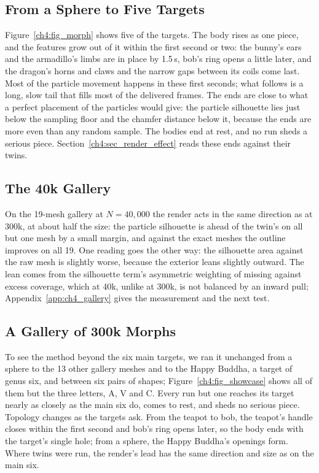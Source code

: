 \subsection{From a Sphere to Five Targets}
Figure~\ref{ch4:fig_morph} shows five of the targets. The body rises as one piece, and the features grow out of it within
the first second or two: the bunny's ears and the armadillo's limbs are in place by 1.5\,s, bob's ring opens a little
later, and the dragon's horns and claws and the narrow gaps between its coils come last. Most of the particle movement
happens in these first seconds; what follows is a long, slow tail that fills most of the delivered frames. The ends are
close to what a perfect placement of the particles would give: the particle silhouette lies just below the sampling floor
and the chamfer distance below it, because the ends are more even than any random sample. The bodies end at rest, and no
run sheds a serious piece. Section~\ref{ch4:sec_render_effect} reads these ends against their twins.

\subsection{The 40k Gallery}
\label{ch4:sec_gallery40}
On the 19-mesh gallery at $N=40{,}000$ the render acts in the same direction as at 300k, at about half the size: the
particle silhouette is ahead of the twin's on all but one mesh by a small margin, and against the exact meshes the outline
improves on all 19. One reading goes the other way: the silhouette area against the raw mesh is slightly worse, because the
exterior leans slightly outward. The lean comes from the silhouette term's asymmetric weighting of missing against excess
coverage, which at 40k, unlike at 300k, is not balanced by an inward pull; Appendix~\ref{app:ch4_gallery} gives the
measurement and the next test.

\subsection{A Gallery of 300k Morphs}
\label{ch4:sec_showcase}
To see the method beyond the six main targets, we ran it unchanged from a sphere to the 13 other gallery meshes and to the
Happy Buddha, a target of genus six, and between six pairs of shapes; Figure~\ref{ch4:fig_showcase} shows all of them but
the three letters, A, V and C. Every run but one
reaches its target nearly as closely as the main six do, comes to rest, and sheds no serious piece. Topology changes as
the targets ask. From the teapot to bob, the teapot's handle closes within the first second and bob's ring opens later,
so the body ends with the target's single hole; from a sphere, the Happy Buddha's openings form. Where twins were run, the
render's lead has the same direction and size as on the main six.

